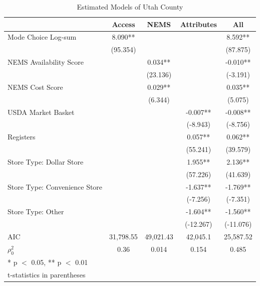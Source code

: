 \documentclass[
  letterpaper,
  DIV=11,
  numbers=noendperiod]{scrreport}
\begin{document}
\hypertarget{tbl-utah-models}{}
\begin{table}
\caption{\label{tbl-utah-models}Estimated Models of Utah County }\tabularnewline

\centering
\begin{tabular}[t]{lcccc}
\toprule
  & Access & NEMS & Attributes & All\\
\midrule
Mode Choice Log-sum & 8.090** &  &  & 8.592**\\
 & (95.354) &  &  & (87.875)\\
NEMS Availability Score &  & 0.034** &  & -0.010**\\
 &  & (23.136) &  & (-3.191)\\
NEMS Cost Score &  & 0.029** &  & 0.035**\\
 &  & (6.344) &  & (5.075)\\
USDA Market Basket &  &  & -0.007** & -0.008**\\
 &  &  & (-8.943) & (-8.756)\\
Registers &  &  & 0.057** & 0.062**\\
 &  &  & (55.241) & (39.579)\\
Store Type: Dollar Store &  &  & 1.955** & 2.136**\\
 &  &  & (57.226) & (41.639)\\
Store Type: Convenience Store &  &  & -1.637** & -1.769**\\
 &  &  & (-7.256) & (-7.351)\\
Store Type: Other &  &  & -1.604** & -1.560**\\
 &  &  & (-12.267) & (-11.076)\\
\midrule
AIC & 31,798.55 & 49,021.43 & 42,045.1 & 25,587.52\\
$\rho^2_0$ & 0.36 & 0.014 & 0.154 & 0.485\\
\bottomrule
\multicolumn{5}{l}{\rule{0pt}{1em}* p $<$ 0.05, ** p $<$ 0.01}\\
\multicolumn{5}{l}{\rule{0pt}{1em}t-statistics in parentheses}\\
\end{tabular}
\end{table}
\end{document}
